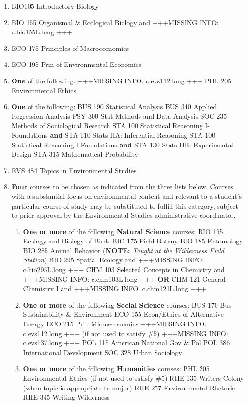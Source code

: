 \documentclass[
  letterpaper,
]{scrbook}
\providecommand{\tightlist}{%
  \setlength{\itemsep}{0pt}\setlength{\parskip}{0pt}}
\begin{document}
\begin{enumerate}
\def\labelenumi{\arabic{enumi}.}
\tightlist
\item
  BIO105 Introductory Biology
\item
  BIO 155 Organismal \& Ecological Biology and +++MISSING INFO:
  c.bio155L.long +++
\item
  ECO 175 Principles of Macroeconomics
\item
  ECO 195 Prin of Environmental Economics
\item
  \textbf{One} of the following: +++MISSING INFO: c.evs112.long +++ PHL
  205 Environmental Ethics
\item
  \textbf{One} of the following: BUS 190 Statistical Analysis BUS 340
  Applied Regression Analysis PSY 300 Stat Methods and Data Analysis SOC
  235 Methods of Sociological Research STA 100 Statistical Reasoning
  I-Foundations \textbf{and} STA 110 Stats IIA: Inferential Reasoning
  STA 100 Statistical Reasoning I-Foundations \textbf{and} STA 130 Stats
  IIB: Experimental Design STA 315 Mathematical Probability
\item
  EVS 484 Topics in Environmental Studies
\item
  \textbf{Four} courses to be chosen as indicated from the three lists
  below. Courses with a substantial focus on environmental content and
  relevant to a student's particular course of study may be substituted
  to fulfill this category, subject to prior approval by the
  Environmental Studies administrative coordinator.

  \begin{enumerate}
  \def\labelenumii{\alph{enumii}.}
  \tightlist
  \item
    \textbf{One or more} of the following \textbf{Natural Science}
    courses: BIO 165 Ecology and Biology of Birds BIO 175 Field Botany
    BIO 185 Entomology BIO 285 Animal Behavior (\textbf{NOTE:}
    \emph{Taught at the Wilderness Field Station}) BIO 295 Spatial
    Ecology and +++MISSING INFO: c.bio295L.long +++ CHM 103 Selected
    Concepts in Chemistry and +++MISSING INFO: c.chm103L.long +++
    \textbf{OR} CHM 121 General Chemistry I and +++MISSING INFO:
    c.chm121L.long +++
  \item
    \textbf{One or more} of the following \textbf{Social Science}
    courses: BUS 170 Bus Sustainability \& Environment ECO 155
    Econ/Ethics of Alternative Energy ECO 215 Prin Microeconomics
    +++MISSING INFO: c.evs112.long +++ (if not used to satisfy \#5)
    +++MISSING INFO: c.evs137.long +++ POL 115 American National Gov \&
    Pol POL 386 International Development SOC 328 Urban Sociology
  \item
    \textbf{One or more} of the following \textbf{Humanities} courses:
    PHL 205 Environmental Ethics (if not used to satisfy \#5) RHE 135
    Writers Colony (when topic is appropriate to major) RHE 257
    Environmental Rhetoric RHE 345 Writing Wilderness
  \end{enumerate}
\end{enumerate}
\end{document}
